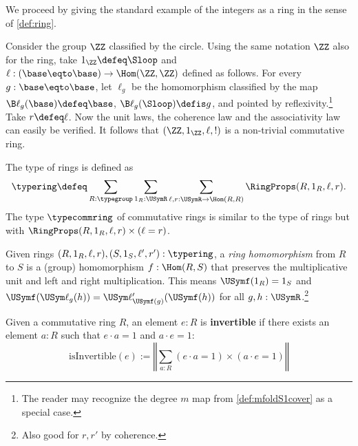 We proceed by giving the standard example of the integers as a ring
in the sense of \cref{def:ring}.
\begin{example}
Consider the group $\ZZ$ classified by the circle.
Using the same notation $\ZZ$ also for the ring, take $1_\ZZ \defeq\Sloop$
and $\ell: (\base\eqto\base)\to\Hom(\ZZ,\ZZ)$ defined as follows.
For every $g:\base\eqto\base$, let $\ell_g$ be the homomorphism
classified by the map $\B\ell_g(\base)\defeq\base$, 
$\B\ell_g(\Sloop)\defis g$, and pointed by reflexivity.\footnote{%
The reader may recognize the degree $m$
map from \cref{def:mfoldS1cover} as a special case.}
Take $r\defeq\ell$. Now the unit laws, the coherence law and
the associativity law can easily be verified. It follows that
$(\ZZ,1_\ZZ,\ell,!)$ is a non-trivial commutative ring.
\end{example}

\begin{definition}\label{def:typealtring}
The type of rings is defined as
\[
\typering\defeq\sum_{R:\typegroup}\sum_{1_R:\USymR}\sum_{\ell,r:\USymR\to\Hom(R,R)} \RingProps(R,1_R,\ell,r).
\]
The type $\typecommring$ of commutative rings is similar to the type
of rings but with $\RingProps(R,1_R,\ell,r) \times(\ell=r)$. 
\end{definition}

\begin{definition}\label{def:ringhom}
Given rings $(R,1_R,\ell,r),(S,1_S,\ell',r') : \typering$,
a \emph{ring homomorphism} from $R$ to $S$ is a (group) homomorphism
$f:\Hom(R,S)$ that preserves the multiplicative unit and 
left and right multiplication. This means $\USymf(1_R) = 1_S$ and
$\USymf(\USym\ell_g(h)) = \USym\ell'_{\USymf(g)}(\USymf(h))$ for
all $g,h:\USymR$.\footnote{Also good for $r,r'$ by coherence.}
\end{definition}









\begin{definition}
Given a commutative ring $R$, an element $e:R$ is \textbf{invertible} if there exists an element $a:R$ such that $e \cdot a = 1$ and $a \cdot e = 1$:
$$\mathrm{isInvertible}(e) := \left\Vert\sum_{a:R} (e \cdot a = 1) \times (a \cdot e = 1)\right\Vert$$
\end{definition}

